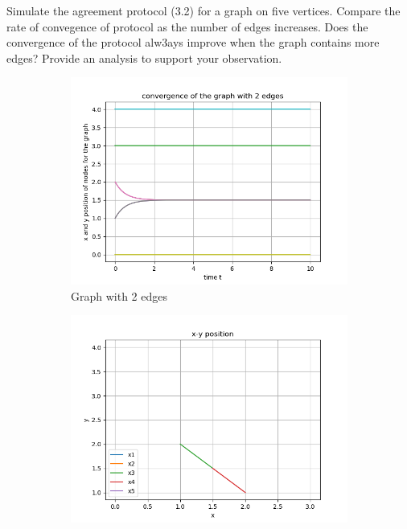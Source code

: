\documentclass{article}
\begin{document}
\begin{problem}
    Simulate the agreement protocol (3.2) for a graph on five vertices. Compare the rate of convegence of protocol as the number of edges increases. Does the convergence of the protocol alw3ays improve when the graph contains more edges? Provide an analysis to support your observation. 
    \begin{figure}[!ht]
        \centering
        \begin{subfigure}{0.4\textwidth}
            \includegraphics[width=\textwidth]{./img/p3_edge_2_1.png}
            \caption{Graph with 2 edges}
        \end{subfigure}
        \begin{subfigure}{0.4\textwidth}
            \includegraphics[width=\textwidth]{./img/p3_edge_2_2.png}

\end{subfigure}
\end{figure}
\end{problem}
\end{document}
